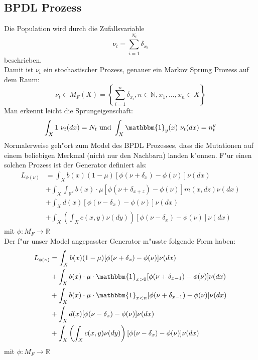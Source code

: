 \documentclass[11pt, a4paper, german]{article}
\begin{document}
	\subsection{BPDL Prozess}
	Die Population wird durch die Zufallsvariable
	\[ \nu_t = \sum_{i=1}^{N_t} \delta_{x_i} \]
	beschrieben. \\
	Damit ist $ \nu_t $	ein stochastischer Prozess, genauer ein Markov Sprung Prozess auf dem Raum:
	\[ \nu_t \in M_F(X) = \left\{ \sum_{i=1}^{n} \delta_{x_i}, n \in \mathbb{N}, x_1, \dots, x_n \in X \right\} \]
	Man erkennt leicht die Sprungeigenschaft:
	\[ \int_X 1 \text{ } \nu_t(dx) = N_t 
	\text{ und }
	\int_X \mathbbm{1}_y(x) \text{ } \nu_t(dx) = n_t^{y} \]
	Normalerweise geh"ort zum Model des BPDL Prozesses, dass die Mutationen auf einem beliebigen Merkmal (nicht nur den Nachbarn) landen k"onnen. F"ur einen solchen Prozess ist der Generator definiert als:
	\begin{align*}
		L_{\phi(\nu)} &= \int_{X} b(x)(1-\mu)[\phi(\nu + \delta_x) - \phi(\nu)]\nu(dx)\\
					  &+ \int_{X}\int_{\mathbb{R}^d} b(x) \cdot \mu [\phi(\nu + \delta_{x+z}) - \phi(\nu)] m(x,dz) \nu(dx)\\
				  	  &+ \int_{X} d(x)[\phi(\nu - \delta_x) - \phi(\nu)]\nu(dx)\\
				 	  &+ \int_{X} \left( \int_{X} c(x,y) \nu(dy) \right) [\phi(\nu - \delta_x) - \phi(\nu)]\nu(dx)
	\end{align*}
	mit $ \phi: M_F \to \mathbb{R} $\\
	Der f"ur unser Model angepasster Generator m"usste folgende Form haben:
	\begin{align*}
		L_{\phi(\nu)} &= \int_{X} b(x)(1-\mu)[\phi(\nu + \delta_x) - \phi(\nu)]\nu(dx)\\
					  &+ \int_{X} b(x) \cdot \mu \cdot \mathbbm{1}_{x > 0} 
					  [\phi(\nu + \delta_{x-1}) - \phi(\nu)]  \nu(dx)\\
					  &+ \int_{X} b(x) \cdot \mu \cdot \mathbbm{1}_{x < n} 
					  [\phi(\nu + \delta_{x-1}) - \phi(\nu)]  \nu(dx)\\
					  &+ \int_{X} d(x)[\phi(\nu - \delta_x) - \phi(\nu)]\nu(dx)\\
					  &+ \int_{X} \left( \int_{X} c(x,y) \nu(dy) \right) [\phi(\nu - \delta_x) - \phi(\nu)]\nu(dx)
	\end{align*}
	mit $ \phi: M_F \to \mathbb{R} $\\	

		
\end{document}
